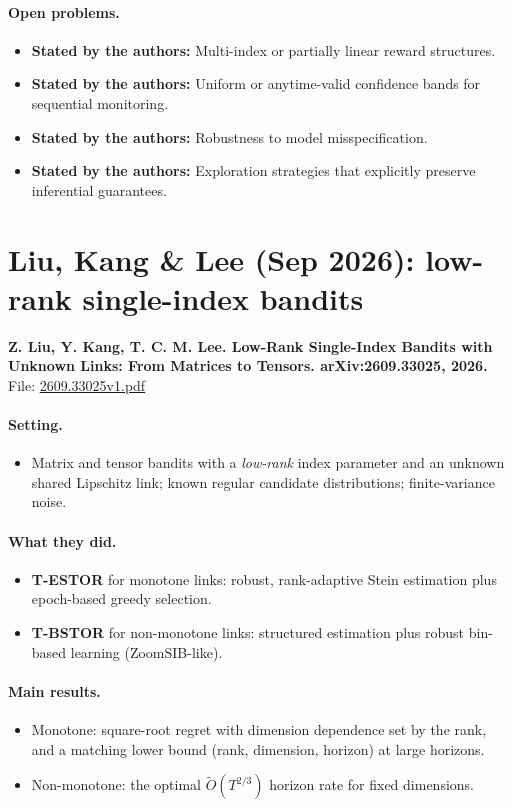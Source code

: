 \documentclass[11pt]{article}
\newcommand{\stated}{\textcolor{green!40!black}{\textbf{Stated by the authors:}}}
\newcommand{\file}[1]{\url{#1}}
\begin{document}
\paragraph{Open problems.}
\begin{itemize}\item \stated{} Multi-index or partially linear reward structures.\item \stated{} Uniform or anytime-valid confidence bands for sequential monitoring.\item \stated{} Robustness to model misspecification.\item \stated{} Exploration strategies that explicitly preserve inferential guarantees.\end{itemize}
\section{Liu, Kang \& Lee (Sep 2026): low-rank single-index bandits}
\textbf{Z. Liu, Y. Kang, T. C. M. Lee. Low-Rank Single-Index Bandits with Unknown Links: From Matrices to Tensors. arXiv:2609.33025, 2026.}\\ File: \file{2609.33025v1.pdf}
\paragraph{Setting.}
\begin{itemize}\item Matrix and tensor bandits with a \emph{low-rank} index parameter and an unknown shared Lipschitz link; known regular candidate distributions; finite-variance noise.\end{itemize}
\paragraph{What they did.}
\begin{itemize}\item \textbf{T-ESTOR} for monotone links: robust, rank-adaptive Stein estimation plus epoch-based greedy selection.\item \textbf{T-BSTOR} for non-monotone links: structured estimation plus robust bin-based learning (ZoomSIB-like).\end{itemize}
\paragraph{Main results.}
\begin{itemize}\item Monotone: square-root regret with dimension dependence set by the rank, and a matching lower bound (rank, dimension, horizon) at large horizons.\item Non-monotone: the optimal $\tilde O(T^{2/3})$ horizon rate for fixed dimensions.\end{itemize}
\end{document}
